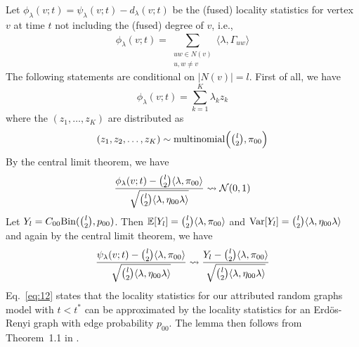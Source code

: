 \documentclass[final]{IEEEtran}
\theoremstyle{definition}
\begin{document}
\begin{IEEEproof}
Let $\phi_{\lambda}(v;t) = \psi_{\lambda}(v;t) - d_{\lambda}(v;t)$ be
the (fused) locality statistics for
vertex $v$ at time $t$ not including the (fused) degree of $v$, i.e.,
\begin{equation}
  \label{eq:11}
  \phi_{\lambda}(v;t) = \sum_{\substack{uw
      \in N(v) \\ u,w \not = v}} \langle \lambda,
  \widehat{\Gamma}_{uw} \rangle
\end{equation}
The following statements are conditional on $|N(v)| = l$. First
of all, we have
\begin{equation*}
  \phi_{\lambda}(v;t) = \sum_{k=1}^{K}{\lambda_k z_k}
\end{equation*}
where the $(z_1, \dots, z_K)$ are distributed as
\begin{gather*}
  (z_1,z_2,\dots,z_K) \sim \textrm{multinomial}\Bigl(
  \tbinom{l}{2}, \pi_{00}\Bigr) 
\end{gather*}
By the central limit theorem, we have
\begin{equation*}
  \frac{\phi_\lambda(v;t) - \tbinom{l}{2} \langle \lambda, \pi_{00}
    \rangle}{\sqrt{\tbinom{l}{2} \langle \lambda, \eta_{00} \lambda \rangle}}
 \rightsquigarrow \mathcal{N}(0,1) 
\end{equation*}
Let $Y_{l} = C_{00} \mathrm{Bin}(\tbinom{l}{2}, p_{00})$. Then $\mathbb{E}[Y_l] = \tbinom{l}{2} \langle \lambda, \pi_{00} \rangle$
and $\mathrm{Var}[Y_l] = \tbinom{l}{2} \langle \lambda,
\eta_{00} \lambda \rangle$ and again by the central limit theorem, we have
\begin{equation}
  \label{eq:12}
  \frac{\psi_{\lambda}(v;t) - \tbinom{l}{2} \langle \lambda, \pi_{00}
    \rangle}{\sqrt{\tbinom{l}{2} \langle \lambda, \eta_{00} \lambda
      \rangle}} \rightsquigarrow \frac{Y_l - \tbinom{l}{2} \langle \lambda, \pi_{00} \rangle}{\sqrt{\tbinom{l}{2}
    \langle \lambda, \eta_{00} \lambda \rangle}}
\end{equation}
Eq.~\eqref{eq:12} states that the locality statistics for our
attributed random graphs model with $t < t^{*}$
can be approximated by the locality statistics for an Erd\"{o}s-Renyi
graph with edge probability $p_{00}$. The lemma then follows
from Theorem~1.1 in \cite{rukhin:_limit_distr_graph_scan_statis}.
\end{IEEEproof}
\end{document}
